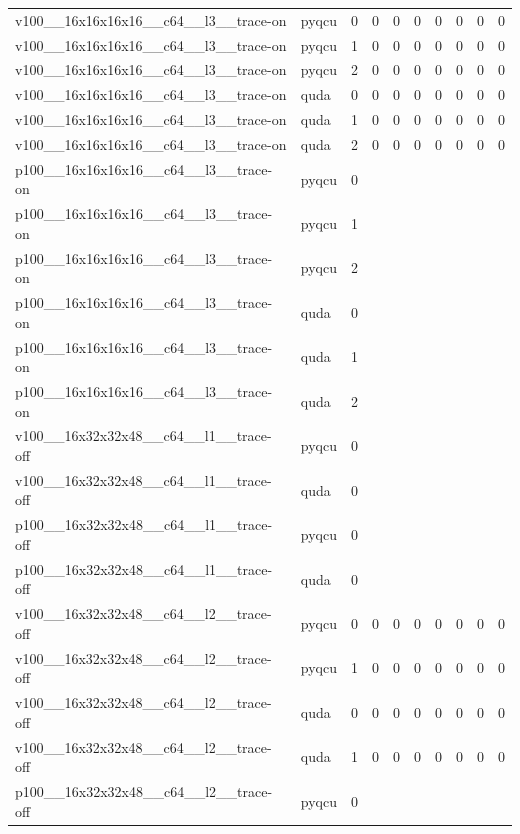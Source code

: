 \begin{table}[htbp]
\begin{tabular}{@{}llrrrrrrrr@{}}
v100\_\_16x16x16x16\_\_c64\_\_l3\_\_trace-on & pyqcu & 0 & 0 & 0 & 0 & 0 & 0 & 0 & 0 \\
v100\_\_16x16x16x16\_\_c64\_\_l3\_\_trace-on & pyqcu & 1 & 0 & 0 & 0 & 0 & 0 & 0 & 0 \\
v100\_\_16x16x16x16\_\_c64\_\_l3\_\_trace-on & pyqcu & 2 & 0 & 0 & 0 & 0 & 0 & 0 & 0 \\
v100\_\_16x16x16x16\_\_c64\_\_l3\_\_trace-on & quda & 0 & 0 & 0 & 0 & 0 & 0 & 0 & 0 \\
v100\_\_16x16x16x16\_\_c64\_\_l3\_\_trace-on & quda & 1 & 0 & 0 & 0 & 0 & 0 & 0 & 0 \\
v100\_\_16x16x16x16\_\_c64\_\_l3\_\_trace-on & quda & 2 & 0 & 0 & 0 & 0 & 0 & 0 & 0 \\
p100\_\_16x16x16x16\_\_c64\_\_l3\_\_trace-on & pyqcu & 0 &  &  &  &  &  &  &  \\
p100\_\_16x16x16x16\_\_c64\_\_l3\_\_trace-on & pyqcu & 1 &  &  &  &  &  &  &  \\
p100\_\_16x16x16x16\_\_c64\_\_l3\_\_trace-on & pyqcu & 2 &  &  &  &  &  &  &  \\
p100\_\_16x16x16x16\_\_c64\_\_l3\_\_trace-on & quda & 0 &  &  &  &  &  &  &  \\
p100\_\_16x16x16x16\_\_c64\_\_l3\_\_trace-on & quda & 1 &  &  &  &  &  &  &  \\
p100\_\_16x16x16x16\_\_c64\_\_l3\_\_trace-on & quda & 2 &  &  &  &  &  &  &  \\
v100\_\_16x32x32x48\_\_c64\_\_l1\_\_trace-off & pyqcu & 0 &  &  &  &  &  &  &  \\
v100\_\_16x32x32x48\_\_c64\_\_l1\_\_trace-off & quda & 0 &  &  &  &  &  &  &  \\
p100\_\_16x32x32x48\_\_c64\_\_l1\_\_trace-off & pyqcu & 0 &  &  &  &  &  &  &  \\
p100\_\_16x32x32x48\_\_c64\_\_l1\_\_trace-off & quda & 0 &  &  &  &  &  &  &  \\
v100\_\_16x32x32x48\_\_c64\_\_l2\_\_trace-off & pyqcu & 0 & 0 & 0 & 0 & 0 & 0 & 0 & 0 \\
v100\_\_16x32x32x48\_\_c64\_\_l2\_\_trace-off & pyqcu & 1 & 0 & 0 & 0 & 0 & 0 & 0 & 0 \\
v100\_\_16x32x32x48\_\_c64\_\_l2\_\_trace-off & quda & 0 & 0 & 0 & 0 & 0 & 0 & 0 & 0 \\
v100\_\_16x32x32x48\_\_c64\_\_l2\_\_trace-off & quda & 1 & 0 & 0 & 0 & 0 & 0 & 0 & 0 \\
p100\_\_16x32x32x48\_\_c64\_\_l2\_\_trace-off & pyqcu & 0 &  &  &  &  &  &  &  \\

\end{tabular}
\end{table}
